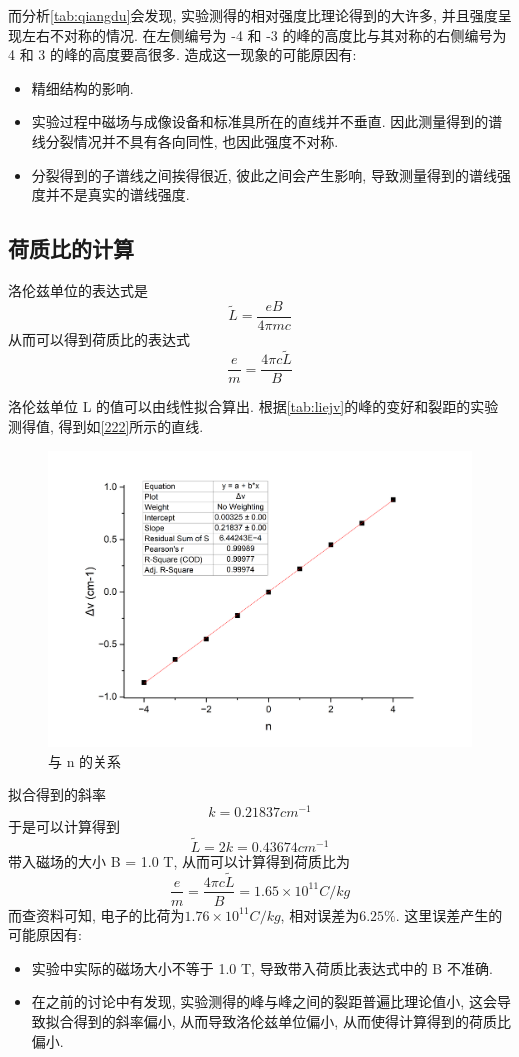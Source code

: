 \documentclass[font=default]{mpltx}
\begin{document}
而分析\autoref{tab:qiangdu}会发现, 实验测得的相对强度比理论得到的大许多, 并且强度呈现左右不对称的情况. 
在左侧编号为 -4 和 -3 的峰的高度比与其对称的右侧编号为 4 和 3 的峰的高度要高很多.
造成这一现象的可能原因有:
\begin{itemize}
  \item 精细结构的影响.
  \item 实验过程中磁场与成像设备和标准具所在的直线并不垂直. 因此测量得到的谱线分裂情况并不具有各向同性, 也因此强度不对称.
  \item 分裂得到的子谱线之间挨得很近, 彼此之间会产生影响, 导致测量得到的谱线强度并不是真实的谱线强度.
\end{itemize}

\subsection{荷质比的计算}

洛伦兹单位的表达式是$$ \tilde{L} = \frac{eB}{4\pi mc}$$
从而可以得到荷质比的表达式$$\frac{e}{m} = \frac{4\pi c \tilde{L}}{B}$$

洛伦兹单位 L 的值可以由线性拟合算出. 根据\autoref{tab:liejv}的峰的变好和裂距的实验测得值, 得到如\autoref{222}所示的直线.
\begin{figure}[htbp]
  \centering
  \includegraphics[width=0.85\linewidth]{fig/222.png}
  \caption{\delta \nu 与 n 的关系}
  \label{fig:222}
\end{figure}

拟合得到的斜率$$k = 0.21837 cm^{-1}$$
于是可以计算得到$$ \tilde{L} = 2k = 0.43674 cm^{-1}$$
带入磁场的大小 B = 1.0 T, 从而可以计算得到荷质比为$$\frac{e}{m} = \frac{4\pi c \tilde{L}}{B} = 1.65 \times 10^{11} C/kg$$
而查资料可知, 电子的比荷为$1.76 \times 10^{11} C/kg$, 相对误差为$ 6.25\%$. 这里误差产生的可能原因有:
\begin{itemize}
  \item 实验中实际的磁场大小不等于 1.0 T, 导致带入荷质比表达式中的 B 不准确.
  \item 在之前的讨论中有发现, 实验测得的峰与峰之间的裂距普遍比理论值小, 这会导致拟合得到的斜率偏小, 从而导致洛伦兹单位偏小, 从而使得计算得到的荷质比偏小.
\end{itemize}
\end{document}

